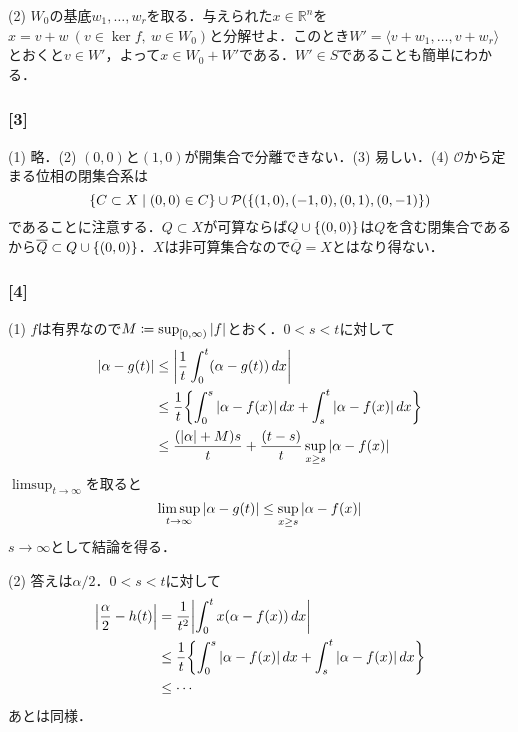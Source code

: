 \documentclass[a4j]{ltjsarticle}
\newcommand{\Rset}{\mathbb{R}}
\newcommand{\1}{\mathbbm{1}}
\numberwithin{equation}{section}
\theoremstyle{definition}
\begin{document}
(2) $W_{0}$の基底$w_1,\ldots,w_r$を取る．与えられた$x\in\Rset^n$を$x=v+w\ (v\in\ker f,\ w\in W_{0})$と分解せよ．このとき$W'=\langle v+w_1,\ldots,v+w_r\rangle$とおくと$v\in W'$，よって$x\in W_{0}+W'$である．$W'\in S$であることも簡単にわかる．
\subsubsection*{[3]}
(1) 略．(2) $(0,0)$と$(1,0)$が開集合で分離できない．(3) 易しい．(4) $\mathcal{O}$から定まる位相の閉集合系は
\begin{equation}
    \qty{C\subset X\mid (0,0)\in C}\cup \mathcal{P}(\qty{(1,0),(-1,0),(0,1),(0,-1)})
\end{equation}
であることに注意する．$Q\subset X$が可算ならば$Q\cup \qty{(0,0)}$は$Q$を含む閉集合であるから$\overline{Q}\subset Q\cup \qty{(0,0)}$．$X$は非可算集合なので$\overline{Q}=X$とはなり得ない．

\subsubsection*{[4]}
(1) $f$は有界なので$M\coloneq \sup_{[0,\infty)}\abs{f}$とおく．$0<s<t$に対して
\begin{align}
    \abs{\alpha-g(t)}&\leq \abs{\frac{1}{t}\int_{0}^t (\alpha-g(t))\,dx}\\
    &\leq \frac{1}{t}\qty{\int_{0}^s \abs{\alpha-f(x)}\,dx+\int_{s}^t\abs{\alpha-f(x)}\,dx}\\
    &\leq \frac{(\abs{\alpha}+M)s}{t}+\frac{(t-s)}{t}\sup_{x\geq s}\abs{\alpha-f(x)}
\end{align}
$\limsup_{t\to\infty}$を取ると
\begin{equation}
    \limsup_{t\to\infty}\abs{\alpha-g(t)}\leq \sup_{x\geq s}\abs{\alpha-f(x)}
\end{equation}
$s\to\infty$として結論を得る．

(2) 答えは$\alpha/2$．$0<s<t$に対して
\begin{align}
    \abs{\frac{\alpha}{2}-h(t)}&= \frac{1}{t^2}\abs{\int_{0}^tx(\alpha-f(x))\,dx}\\
    &\leq \frac{1}{t}\qty{\int_0^s \abs{\alpha-f(x)}\,dx+\int_s^t \abs{\alpha-f(x)}\,dx} \\
    &\leq \cdots 
\end{align}
あとは同様．
\end{document}
